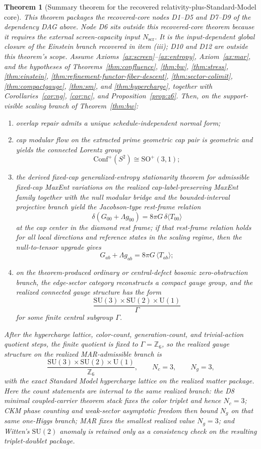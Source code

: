 \documentclass[11pt]{article}
\newtheorem{theorem}{Theorem}[section]
\newcommand{\SU}{\mathrm{SU}}
\newcommand{\U}{\mathrm{U}}
\newcommand{\Conf}{\mathrm{Conf}}
\begin{document}
\begin{theorem}[Summary theorem for the recovered relativity-plus-Standard-Model core]\label{thm:master}
This theorem packages the recovered-core nodes D1--D5 and D7--D9 of the dependency DAG above. Node D6 sits outside this recovered-core theorem because it requires the external screen-capacity input \(N_{\mathrm{scr}}\). It is the input-dependent global closure of the Einstein branch recovered in item (iii); D10 and D12 are outside this theorem's scope. Assume Axioms~\ref{ax:screen}--\ref{ax:entropy}, Axiom~\ref{ax:mar}, and the hypotheses of Theorems~\ref{thm:confluence}, \ref{thm:bw}, \ref{thm:stress}, \ref{thm:einstein}, \ref{thm:refinement-functor-fiber-descent}, \ref{thm:sector-colimit}, \ref{thm:compactgauge}, \ref{thm:sm}, and \ref{thm:hypercharge}, together with Corollaries~\ref{cor:ng}, \ref{cor:nc}, and Proposition~\ref{prop:z6}. Then, on the support-visible scaling branch of Theorem~\ref{thm:bw}:
\begin{enumerate}[label=(\roman*),leftmargin=2em]
\item overlap repair admits a unique schedule-independent normal form;
\item cap modular flow on the extracted prime geometric cap pair is geometric and yields the connected Lorentz group
\[
\Conf^+(S^2)\cong \mathrm{SO}^+(3,1);
\]
\item the derived fixed-cap generalized-entropy stationarity theorem for admissible fixed-cap MaxEnt variations on the realized cap-label-preserving MaxEnt family together with the null modular bridge and the bounded-interval projective branch yield the Jacobson-type rest-frame relation
\[
\delta\!\left(G_{00}+\Lambda g_{00}\right)=8\pi G\,\delta\langle T_{00}\rangle
\]
at the cap center in the diamond rest frame; if that rest-frame relation holds for all local directions and reference states in the scaling regime, then the null-to-tensor upgrade gives
\[
G_{ab}+\Lambda g_{ab}=8\pi G\,\langle T_{ab}\rangle;
\]
\item on the theorem-produced ordinary or central-defect bosonic zero-obstruction branch, the edge-sector category reconstructs a compact gauge group, and the realized connected gauge structure has the form
\[
\frac{\SU(3)\times\SU(2)\times\U(1)}{\Gamma}
\]
for some finite central subgroup \(\Gamma\).
\end{enumerate}
After the hypercharge lattice, color-count, generation-count, and trivial-action quotient steps, the finite quotient is fixed to \(\Gamma=\mathbb Z_6\), so the realized gauge structure on the realized MAR-admissible branch is
\[
\frac{\SU(3)\times\SU(2)\times\U(1)}{\mathbb Z_6},
\qquad
N_c=3,
\qquad
N_g=3,
\]
with the exact Standard Model hypercharge lattice on the realized matter package. Here the count statements are internal to the same realized branch: the D8 minimal coupled-carrier theorem stack fixes the color triplet and hence \(N_c=3\); CKM phase counting and weak-sector asymptotic freedom then bound \(N_g\) on that same one-Higgs branch; MAR fixes the smallest realized value \(N_g=3\); and Witten's \(\SU(2)\) anomaly is retained only as a consistency check on the resulting triplet-doublet package.
\end{theorem}
\end{document}
